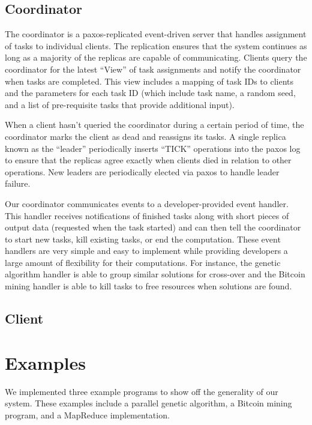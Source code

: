 \documentclass [11pt, twocolumn] {article}
\begin{document}
\subsection {Coordinator} 

The coordinator is a paxos-replicated event-driven server that handles assignment of tasks to individual clients. The replication ensures that the system continues as long as a majority of the replicas are capable of communicating. Clients query the coordinator for the latest ``View'' of task assignments and notify the coordinator when tasks are completed. This view includes a mapping of task IDs to clients and the parameters for each task ID (which include task name, a random seed, and a list of pre-requisite tasks that provide additional input). 

When a client hasn't queried the coordinator during a certain period of time, the coordinator marks the client as dead and reassigns its tasks. A single replica known as the ``leader'' periodically inserts ``TICK'' operations into the paxos log to ensure that the replicas agree exactly when clients died in relation to other operations. New leaders are periodically elected via paxos to handle leader failure. 

Our coordinator communicates events to a developer-provided event handler. This handler receives notifications of finished tasks along with short pieces of output data (requested when the task started) and can then tell the coordinator to start new tasks, kill existing tasks, or end the computation. These event handlers are very simple and easy to implement while providing developers a large amount of flexibility for their computations. For instance, the genetic algorithm handler is able to group similar solutions for cross-over and the Bitcoin mining handler is able to kill tasks to free resources when solutions are found. 

\subsection {Client} 

\section {Examples}

We implemented three example programs to show off the generality of our system. These examples include a parallel genetic algorithm, a Bitcoin mining program, and a MapReduce implementation. 
\end{document}

